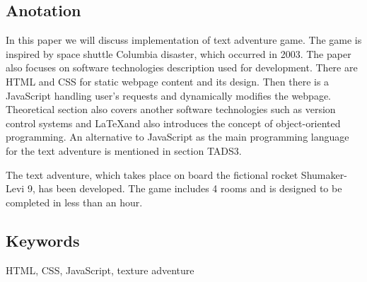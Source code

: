 \documentclass[main.tex]{subfiles}
\begin{document}
\subsection*{Anotation}
In this paper we will discuss implementation of text adventure game. The game is inspired by space shuttle Columbia disaster, which occurred in 2003. The paper also focuses on software technologies description used for development. There are HTML and CSS for static webpage content and its design. Then there is a JavaScript handling user's requests and dynamically modifies the webpage. Theoretical section also covers another software technologies such as version control systems and \LaTeX and also introduces the concept of object-oriented programming. An alternative to JavaScript as the main programming language for the text adventure is mentioned in section TADS3. 

The text adventure, which takes place on board the fictional rocket Shumaker-Levi 9, has been developed. The game includes 4 rooms and is designed to be completed in less than an hour.


\subsection*{Keywords}
HTML, CSS, JavaScript, texture adventure 
\end{document}
